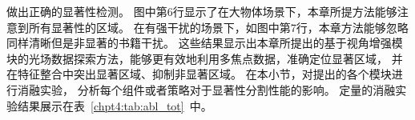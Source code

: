 做出正确的显著性检测。
图中第6行显示了在大物体场景下，本章所提方法能够注意到所有显著性的区域。
在有强干扰的场景下，如图中第7行，本章方法能够忽略同样清晰但是非显著的书籍干扰。
这些结果显示出本章所提出的基于视角增强模块的光场数据探索方法，能够更有效地利用多焦点数据，准确定位显著区域，
并在特征整合中突出显著区域、抑制非显著区域。
%
%
%
%
%
%
在本小节，对提出的各个模块进行消融实验，
分析每个组件或者策略对于显著性分割性能的影响。
定量的消融实验结果展示在表~\ref{chpt4:tab:abl_tot}~中。
